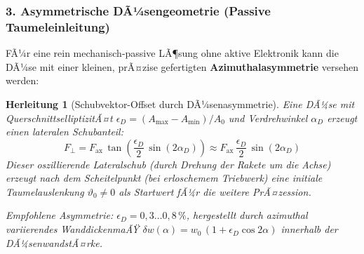 ﻿\documentclass[12pt,a4paper]{article}
\newtheorem{herleitung}{Herleitung}[section]
\begin{document}
\subsubsection{3. Asymmetrische DÃ¼sengeometrie (Passive Taumeleinleitung)}

FÃ¼r eine rein mechanisch-passive LÃ¶sung ohne aktive Elektronik kann die DÃ¼se mit
einer kleinen, prÃ¤zise gefertigten \textbf{Azimuthalasymmetrie} versehen werden:

\begin{herleitung}[Schubvektor-Offset durch DÃ¼senasymmetrie]
Eine DÃ¼se mit QuerschnittselliptizitÃ¤t $\epsilon_D = (A_{\max} - A_{\min})/A_0$
und Verdrehwinkel $\alpha_D$ erzeugt einen lateralen Schubanteil:
\[
  F_\perp = F_{\mathrm{ax}}\,\tan\!\left(\frac{\epsilon_D}{2}\,\sin(2\alpha_D)\right)
  \approx F_{\mathrm{ax}}\,\frac{\epsilon_D}{2}\,\sin(2\alpha_D)
\]
Dieser oszillierende Lateralschub (durch Drehung der Rakete um die Achse) erzeugt
nach dem Scheitelpunkt (bei erloschemem Triebwerk) eine initiale Taumelauslenkung
$\vartheta_0 \neq 0$ als Startwert fÃ¼r die weitere PrÃ¤zession.

Empfohlene Asymmetrie: $\epsilon_D = 0{,}3\ldots0{,}8\,\%$, hergestellt durch
azimuthal variierendes WanddickenmaÃŸ $\delta w(\alpha) = w_0\,(1+\epsilon_D\cos 2\alpha)$
innerhalb der DÃ¼senwandstÃ¤rke.
\end{herleitung}
\end{document}
